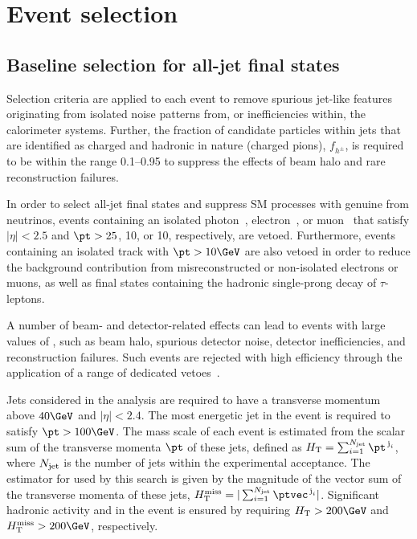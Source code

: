 
\section{Event selection}
\label{sec:selection}

\subsection{Baseline selection for all-jet final states}

Selection criteria are applied to each event to remove spurious
jet-like features originating from isolated noise patterns from, or
inefficiencies within, the calorimeter systems. Further, the fraction
of candidate particles within jets that are identified as charged and
hadronic in nature (\eg charged pions), $f_{h^{\pm}}$, is required to
be within the range 0.1--0.95 to suppress the effects of beam halo and
rare reconstruction failures.

In order to select all-jet final states and suppress SM processes with
genuine \ptvecmiss from neutrinos, events containing an isolated
photon~\cite{PAS-EGM-10-006}, electron~\cite{PAS-EGM-10-004}, or
muon~\cite{PAS-MUO-10-004} that satisfy $|\eta| < 2.5$ and $\pt > 25$,
10, or 10\GeV, respectively, are vetoed. Furthermore, events
containing an isolated track with $\pt > 10\GeV$ are also vetoed in
order to reduce the background contribution from misreconstructed or
non-isolated electrons or muons, as well as final states containing
the hadronic single-prong decay of $\tau$-leptons. 

A number of beam- and detector-related effects can lead to events with
large values of \met, such as beam halo, spurious detector noise,
detector inefficiencies, and reconstruction failures. Such events are
rejected with high efficiency through the application of a range of
dedicated vetoes~\cite{RA1Paper2012, cms-met}. 

Jets considered in the analysis are required to have a transverse
momentum above $40\GeV$ and $|\eta| < 2.4$. The most energetic jet in
the event is required to satisfy $\pt > 100\GeV$. The mass scale of
each event is estimated from the scalar sum of the transverse momenta
$\pt$ of these jets, defined as $\scalht = \sum_{i=1}^{N_{\rm jet}}
\pt^{\,\text{j}_i}$, where $N_{\rm jet}$ is the number of jets
within the experimental acceptance. The estimator for \met used by
this search is given by the magnitude of the vector sum of the
transverse momenta of these jets, $\mht = |\sum_{i=1}^{N_\text{jet}}
\ptvec^{\,\text{j}_i}|$. Significant hadronic activity and
\ptvecmiss in the event is ensured by requiring $\scalht > 200\GeV$
and $\mht > 200\GeV$, respectively.

